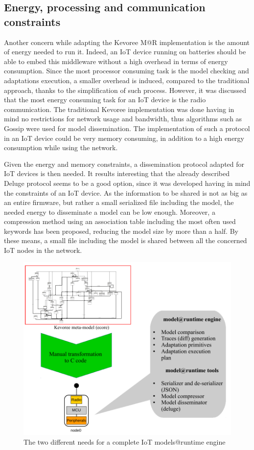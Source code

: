 \subsection{Energy, processing and communication constraints}
\label{subsec:ImplConstraints}
Another concern while adapting the Kevoree M@R implementation is the amount of energy needed to run it.
Indeed, an IoT device running on batteries should be able to embed this middleware without a high overhead in terms of energy consumption.
Since the most processor consuming task is the model checking and adaptations execution, a smaller overhead is induced, compared to the traditional approach, thanks to the simplification of such process.
However, it was discussed that the most energy consuming task for an IoT device is the radio communication.
The traditional Kevoree implementation was done having in mind no restrictions for network usage and bandwidth, thus algorithms such as Gossip\cite{fouquet2012dissemination} were used for model dissemination.
The implementation of such a protocol in an IoT device could be very memory consuming, in addition to a high energy consumption while using the network.

Given the energy and memory constraints, a dissemination protocol adapted for IoT devices is then needed.
It results interesting that the already described Deluge protocol\cite{hui2004dynamic} seems to be a good option, since it was developed having in mind the constraints of an IoT device.
As the information to be shared is not as big as an entire firmware, but rather a small serialized file including the model, the needed energy to disseminate a model can be low enough.
Moreover, a compression method using an association table including the most often used keywords has been proposed, reducing the model size by more than a half.
By these means, a small file including the model is shared between all the concerned IoT nodes in the network.

\begin{figure}[]
	\centering
	\includegraphics[width=0.85\columnwidth]{chapters/modelsAtRuntimeContiki.images/Challenges.pdf}
	\caption{The two different needs for a complete IoT models@runtime engine}
	\label{fig:MAR_Challenges}
\end{figure}

